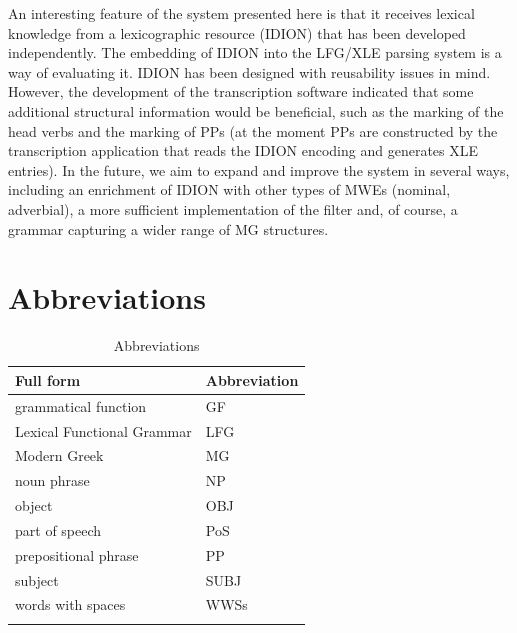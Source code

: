 \documentclass[output=paper,
modfonts
]{langscibook}
\begin{document}
An interesting feature of the system presented here is that it receives lexical knowledge from a lexicographic resource (IDION) that has been developed independently. The embedding of IDION into the LFG/XLE parsing system is a way of evaluating it. IDION has been designed with reusability issues in mind. However, the development of the transcription software indicated that some additional structural information would be beneficial, such as the marking of the head verbs and the marking of PPs (at the moment PPs are constructed by the transcription application that reads the IDION encoding and generates XLE entries). 
%
In the future, we aim to expand and improve the system in several ways, including an enrichment of IDION with other types of MWEs (nominal, adverbial), a more sufficient implementation of the filter and, of course, a grammar capturing a wider range of MG structures. 

\section*{Abbreviations}

\begin{table}[H]
\begin{tabular}{ll}
\lsptoprule
Full form  & Abbreviation \\
\midrule
grammatical function & GF \\
Lexical Functional Grammar & LFG \\
Modern Greek & MG \\
noun phrase & NP \\
object & OBJ\\
part of speech & PoS\\
prepositional phrase & PP\\
subject & SUBJ\\
words with spaces & WWSs \\
\lspbottomrule
\end{tabular}

\caption{Abbreviations}
\end{table}


\end{document}
